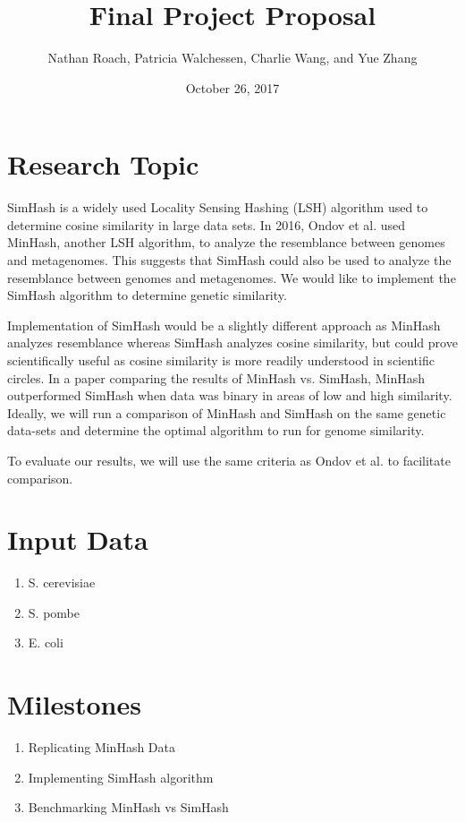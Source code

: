 \documentclass[12pt, letterpaper]{article}
\title{Final Project Proposal}
\author{Nathan Roach, Patricia Walchessen, Charlie Wang, and Yue Zhang}
\date{October 26, 2017}
\begin{document}
\maketitle

\section*{Research Topic}

SimHash is a widely used Locality Sensing Hashing (LSH) algorithm used to determine cosine similarity in large data sets\cite{simhash}. In 2016, Ondov et al. used MinHash, another LSH algorithm, to analyze the resemblance between genomes and metagenomes\cite{MinHash}. This suggests that SimHash could also be used to analyze the resemblance between genomes and metagenomes. We would like to implement the SimHash algorithm to determine genetic similarity. 

Implementation of SimHash would be a slightly different approach as MinHash analyzes resemblance whereas SimHash analyzes cosine similarity, but could prove scientifically useful as cosine similarity is more readily understood in scientific circles. In a paper comparing the results of MinHash vs. SimHash, MinHash outperformed SimHash when data was binary in areas of low and high similarity\cite{SimvsMin}. Ideally, we will run a comparison of MinHash and SimHash on the same genetic data-sets and determine the optimal algorithm to run for genome similarity.

To evaluate our results, we will use the same criteria as Ondov et al. to facilitate comparison.

\section*{Input Data}

\begin{enumerate}
\item S. cerevisiae
\item S. pombe
\item E. coli
\end{enumerate}

\section*{Milestones}

\begin{enumerate}
\item Replicating MinHash Data
\item Implementing SimHash algorithm
\item Benchmarking MinHash vs SimHash
\end{enumerate}
\end{document}
